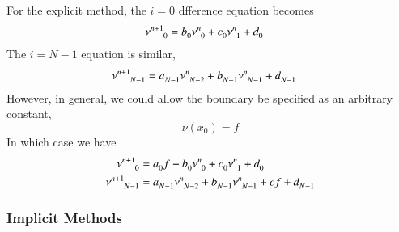 \documentclass[letterpaper,12pt]{article}
\newcommand \bcf{f}
\begin{document}
For the explicit method, the $i=0$ dfference equation becomes
\begin{align}
  \label{eqn:FD_explicit_sink_eqn}
  &
\nu\indices{^{n+1}_{0  }}
=
  b\indices{_0} \nu\indices{^{n  }_{0}}
+ c\indices{_0} \nu\indices{^{n  }_{1}}
+ d\indices{_0}
\end{align}
The $i = N-1$ equation is similar,
\begin{align}
  &
  \label{eqn:FD_explicit_sink_eqn_2}
\nu\indices{^{n+1}_{N-1}}
=
  a\indices{_{N-1}} \nu\indices{^{n  }_{N-2}}
+ b\indices{_{N-1}} \nu\indices{^{n  }_{N-1}}
+ d\indices{_{N-1}}
\end{align}
However, in general, we could allow the boundary be specified as an arbitrary constant,
\begin{equation}
  \label{eq:sink_bc}
  \nu\left(x_0\right) = \bcf
\end{equation}
In which case we have
\begin{align}
\nu\indices{^{n+1}_{0  }}
& 
=
  a\indices{_0} f
+ b\indices{_0} \nu\indices{^{n  }_{0}}
+ c\indices{_0} \nu\indices{^{n  }_{1}}
+ d\indices{_0} \\
\nu\indices{^{n+1}_{N-1}}
&
=
  a\indices{_{N-1}} \nu\indices{^{n  }_{N-2}}
+ b\indices{_{N-1}} \nu\indices{^{n  }_{N-1}}
+ c\bcf
+ d\indices{_{N-1}}
\end{align}



\subsubsection{Implicit Methods}
\end{document}
